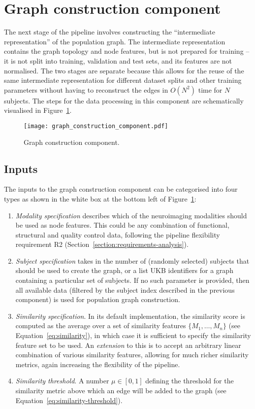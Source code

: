 \section{Graph construction component}
\label{section:graph-construction}
The next stage of the pipeline involves constructing the ``intermediate representation'' of the population graph. The intermediate representation contains the graph topology and node features, but is not prepared for training – it is not split into training, validation and test sets, and its features are not normalised. The two stages are separate because this allows for the reuse of the same intermediate representation for different dataset splits and other training parameters without having to reconstruct the edges in $O(N^2)$ time for $N$ subjects. The steps for the data processing in this component are schematically visualised in Figure~\ref{graph-construction-component}.

\begin{figure}[h]
    \texttt{[image: graph\_construction\_component.pdf]}
    \caption{Graph construction component.}\label{graph-construction-component}
\end{figure}

\subsection{Inputs}
The inputs to the graph construction component can be categorised into four types as shown in the white box at the bottom left of Figure~\ref{graph-construction-component}:
\begin{enumerate}
    \item \textit{Modality specification} describes which of the neuroimaging modalities should be used as node features. This could be any combination of functional, structural and quality control data, following the pipeline flexibility requirement R2 (Section~\ref{section:requirements-analysis}).
    \item \textit{Subject specification} takes in the number of (randomly selected) subjects that should be used to create the graph, or a list UKB identifiers for a graph containing a particular set of subjects. If no such parameter is provided, then all available data (filtered by the subject index described in the previous component) is used for population graph construction.
    \item \textit{Similarity specification}. 
    In its default implementation, the similarity score is computed as the average over a set of similarity features $\{M_1, \dots, M_n\}$ (see Equation~\eqref{eq:similarity}), in which case it is sufficient to specify the similarity feature set to be used. An \textit{extension} to this is to accept an arbitrary linear combination of various similarity features, allowing for much richer similarity metrics, again increasing the flexibility of the pipeline. 
    \item \textit{Similarity threshold}. A number $\mu \in [0,1]$ defining the threshold for the similarity metric above which an edge will be added to the graph (see Equation~\eqref{eq:similarity-threshold}).
\end{enumerate}


